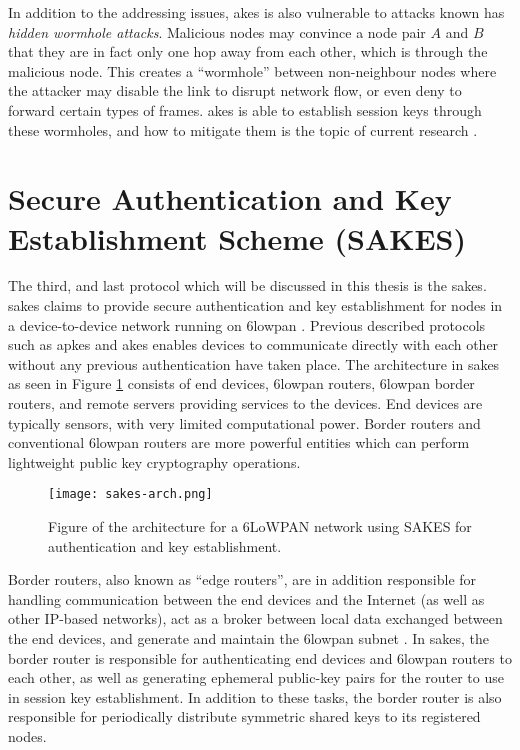 In addition to the addressing issues, \gls{akes} is also vulnerable to attacks known has \emph{hidden wormhole attacks}. Malicious nodes may convince a node pair $A$ and $B$ that they are in fact only one hop away from each other, which is through the malicious node. This creates a ``wormhole'' between non-neighbour nodes where the attacker may disable the link to disrupt network flow, or even deny to forward certain types of frames. \gls{akes} is able to establish session keys through these wormholes, and how to mitigate them is the topic of current research \cite{krentz20146lowpan}. 

\section{Secure Authentication and Key Establishment Scheme (SAKES)}
\label{sec:sakes}

The third, and last protocol which will be discussed in this thesis is the \gls{sakes}. \gls{sakes} claims to provide secure authentication and key establishment for nodes in a device-to-device network running on \gls{6lowpan} \cite{hussen2013sakes}. Previous described protocols such as \gls{apkes} and \gls{akes} enables devices to communicate directly with each other without any previous authentication have taken place. The architecture in \gls{sakes} as seen in Figure \ref{fig:sakes-arch} consists of end devices, \gls{6lowpan} routers, \gls{6lowpan} border routers, and remote servers providing services to the devices. End devices are typically sensors, with very limited computational power. Border routers and conventional \gls{6lowpan} routers are more powerful entities which can perform lightweight public key cryptography operations.


\begin{figure}[h]
	\centering
	\texttt{[image: sakes-arch.png]}
	\caption{Figure of the architecture for a 6LoWPAN network using SAKES for authentication and key establishment.}
	\label{fig:sakes-arch}
\end{figure}


Border routers, also known as ``edge routers'', are in addition responsible for handling communication between the end devices and the Internet (as well as other IP-based networks), act as a broker between local data exchanged between the end devices, and generate and maintain the \gls{6lowpan} subnet \cite{olsson20146lowpan}. In \gls{sakes}, the border router is responsible for authenticating end devices and \gls{6lowpan} routers to each other, as well as generating ephemeral public-key pairs for the router to use in session key establishment. In addition to these tasks, the border router is also responsible for periodically distribute symmetric shared keys to its registered nodes.


